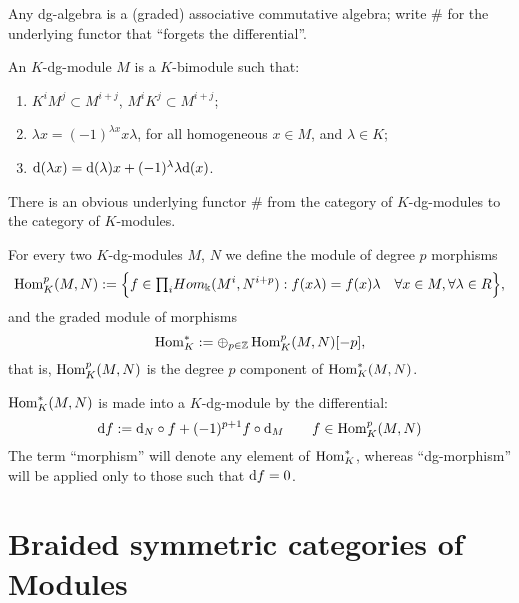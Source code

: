 Any dg-algebra is a (graded) associative commutative algebra; write
$\#$ for the underlying functor that ``forgets the differential''.

\begin{definition}
  An $K$-dg-module $M$ is a $K$-bimodule such that:
  \begin{enumerate}
  \item $K^i M^j \subset M^{i+j}$, $M^i K^j \subset M^{i+j}$;
  \item $\lambda x = (-1)^{\lambda x} x\lambda$, for all homogeneous
    $x\in M$, and $\lambda\in K$;
  \item $\mathrm{d}(\lambda x) = \mathrm{d}(\lambda)x + (-1)^\lambda \lambda\mathrm{d}(x)$.
  \end{enumerate}
\end{definition}

There is an obvious underlying functor $\#$ from the category of
$K$-dg-modules to the category of $K$-modules.

\begin{definition}
  For every two $K$-dg-modules $M$, $N$ we define the module of
  degree $p$ morphisms
  \begin{equation*}
    \operatorname{Hom}_K^p (M,N) := \Bigl\{ f\in  {\textstyle \prod_i} Hom_\Bbbk (M^i, N^{i+p}) :
      f(x\lambda) = f(x)\lambda \quad \forall x\in M, \forall \lambda
      \in R \Bigr\},
  \end{equation*}
  and the graded module of morphisms
  \begin{equation*}
    \operatorname{Hom}_K^* := \oplus_{p\in\mathbb{Z}} \operatorname{Hom}_K^p (M,N)[-p],
  \end{equation*}
  that is, $\operatorname{Hom}_K^p(M,N)$ is the degree $p$ component of
  $\operatorname{Hom}_K^*(M,N)$.
\end{definition}

$\operatorname{Hom}_K^*(M,N)$ is made into a $K$-dg-module by the differential:
\begin{equation*}
  \mathrm{d} f := \mathrm{d}_N \circ f + (-1)^{p+1} f\circ \mathrm{d}_M \qquad f\in \operatorname{Hom}_K^p(M,N)
\end{equation*}
The term ``morphism'' will denote any element of $\operatorname{Hom}_K^*$, whereas
``dg-morphism'' will be applied only to those such that $\mathrm{d} f = 0$.


\section{Braided symmetric categories of Modules}
\label{sec:btc+dg}

